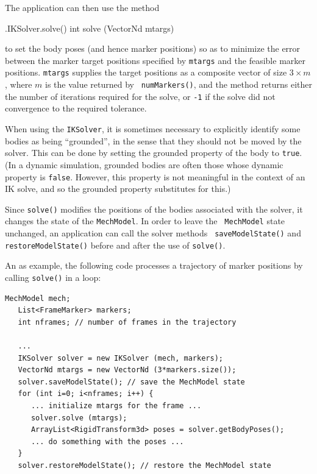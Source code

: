 The application can then use the method
%
\begin{methodtable}{0.5}{0.5}
\methodentry
{\probes.IKSolver.solve()}%
{int solve (VectorNd mtargs)}%
{\ }%
%
\end{methodtable}
%
to set the body poses (and hence marker positions) so as to minimize the error
between the marker target positions specified by {\tt mtargs} and the feasible
marker positions.  {\tt mtargs} supplies the target positions as a composite
vector of size $3 \times m$, where $m$ is the value returned by {\tt
numMarkers()}, and the method returns either the number of iterations required
for the solve, or {\tt -1} if the solve did not convergence to the required
tolerance.

\begin{sideblock}
When using the {\tt IKSolver}, it is sometimes necessary to explicitly identify
some bodies as being ``grounded'', in the sense that they should not be moved
by the solver. This can be done by setting the {\sf grounded} property of the
body to {\tt true}. (In a dynamic simulation, grounded bodies are often those
whose {\sf dynamic} property is {\tt false}. However, this property is not
meaningful in the context of an IK solve, and so the {\sf grounded} property
substitutes for this.)
\end{sideblock}

\begin{sideblock}
Since {\tt solve()} modifies the positions of the bodies associated with the
solver, it changes the state of the {\tt MechModel}. In order to leave the {\tt
MechModel} state unchanged, an application can call the solver methods {\tt
saveModelState()} and {\tt restoreModelState()} before and after the use of
{\tt solve()}.
\end{sideblock}

An as example, the following code processes a trajectory of marker positions by
calling {\tt solve()} in a loop:
%
\begin{lstlisting}[]
   MechModel mech;
   List<FrameMarker> markers;
   int nframes; // number of frames in the trajectory

   ...
   IKSolver solver = new IKSolver (mech, markers);
   VectorNd mtargs = new VectorNd (3*markers.size());
   solver.saveModelState(); // save the MechModel state
   for (int i=0; i<nframes; i++) {
      ... initialize mtargs for the frame ...
      solver.solve (mtargs);
      ArrayList<RigidTransform3d> poses = solver.getBodyPoses();
      ... do something with the poses ...
   }
   solver.restoreModelState(); // restore the MechModel state
\end{lstlisting}
%

